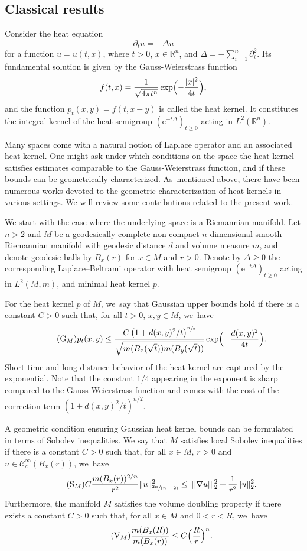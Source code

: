 \documentclass[JEP,XML,SOM,Unicode,published]{cedram}
\newcommand{\spfrac}[2]{\sfrac{#1}{(#2)}}
\newcommand{\rG}{\mathrm{G}}
\newcommand{\rS}{\mathrm{S}}
\newcommand{\rV}{\mathrm{V}}
\theoremstyle{plain}
\theoremstyle{definition}
\newcommand{\RR}{\mathbb{R}}
\newcommand{\cC}{\mathcal{C}}
\newcommand{\euler}{\mathrm{e}}
\begin{document}
\subsection{Classical results}\label{sub:classical}
Consider the heat equation
\[
\partial_t u =-\Delta u
\]
for a function $u=u(t,x)$, where $t>0$, $x\in \RR^n$, and $\Delta=-\sum_{i=1}^n\partial_i^2 $. Its fundamental solution is given by the Gauss-Weierstrass function
\[
f(t,x)=\frac{1}{\sqrt{4\pi t^n}}\exp\Bigl(-\frac{|x|^2}{4t}\Bigr),
\]
and the function $p_t(x,y)=f(t,x-y)$ is called the heat kernel. It constitutes the integral kernel of the heat semigroup $(\euler^{-t\Delta})_{t\geq 0}$ acting in $L^2(\RR^n)$.

Many spaces come with a natural notion of Laplace operator and an associated heat kernel. One might ask under which conditions on the space the heat kernel satisfies estimates comparable to the Gauss-Weierstrass function, and if these bounds can be geometrically characterized. As~mentioned above, there have been numerous works devoted to the geometric characterization of heat kernels in various settings. We will review some contributions related to the present work.

We start with the case where the underlying space is a Riemannian manifold.
Let $n>2$ and $M$ be a geodesically complete non-compact $n$-dimensional smooth Riemannian manifold with geodesic distance $d$ and volume measure $m$, and denote geodesic balls by $B_x(r)$ for $x\in M$ and $r>0$. Denote by $\Delta\geq 0$ the corresponding Laplace--Beltrami operator with heat semigroup $(\euler^{-t\Delta})_{t\geq 0}$ acting in $L^2(M,m)$, and minimal heat kernel $p$.

For the heat kernel $p$ of $M$, we~say that Gaussian upper bounds hold if there is a constant $C>0$ such that, for all $t>0$, $x,y\in M$, we~have
\begin{equation}\tag{$\rG_M$}\label{eq:GM}
p_t(x,y)\leq \frac{C\left(1+{d(x,y)^2}/{t}\right)^{\sfrac{n}{2}}}{\sqrt{m(B_x(\sqrt t))m(B_y(\sqrt t))}}\exp\Bigl(-\frac{d(x,y)^2}{4t}\Bigr).
\end{equation}
Short-time and long-distance behavior of the heat kernel are captured by the exponential.
Note that the constant $1/4$ appearing in the exponent is sharp compared to the Gauss-Weierstrass function and comes with the cost of the correction term $\left(1+{d(x,y)^2}/{t}\right)^{n/2}$.

A geometric condition ensuring Gaussian heat kernel bounds can be formulated in terms of Sobolev inequalities.
We say that $M$ satisfies local Sobolev inequalities if there is a constant $C>0$ such that, for all $x\in M$, $r>0$ and $u\in\cC_c^\infty(B_x(r))$, we~have
\begin{equation}\tag{$\rS_M$}\label{eq:SM}
C\frac{m(B_x(r))^{2/n}}{r^2}\|u\|_{\spfrac{2n}{n-2}}^2\leq \||\nabla u|\|_2^2+\frac{1}{r^2}\|u\|_2^2.
\end{equation}
Furthermore, the manifold $M$ satisfies the volume doubling property if there exists a constant $C>0$ such that, for all $x\in M$ and $0<r<R$, we~have
\begin{equation}\tag{$\rV_M$}\label{eq:VM}
\frac{m(B_x(R))}{m(B_x(r))}\leq C\Bigl(\frac{R}{r}\Bigr)^n.
\end{equation}
\end{document}
